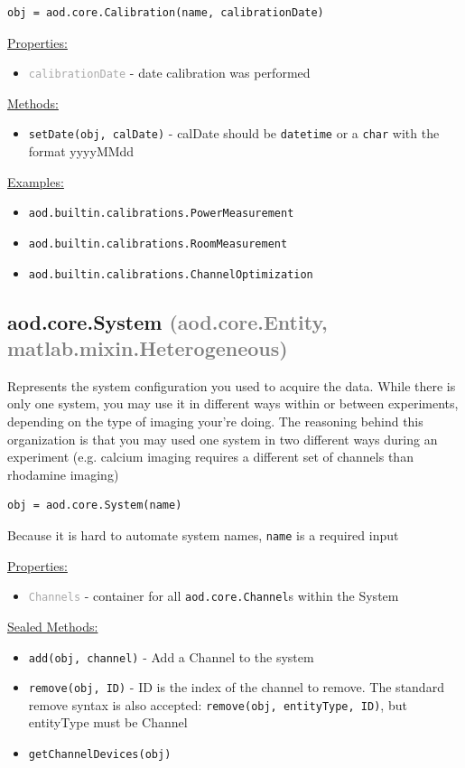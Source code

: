 \documentclass[10pt]{exam}
\newcommand\myparent[1]{\textcolor{gray}{(#1)}}
\newcommand\aodclass[1]{\textcolor{codeblue}{\texttt{#1}}}
\newcommand\aodprop[1]{\textcolor{darkgray}{\texttt{#1}}}
\newcommand\aodfcn[1]{\textcolor{darkteal}{\texttt{#1}}}
\newcommand\docheader[1]{\vspace{0.6ex}\noindent\underline{#1}\vspace{0.15ex}}
\begin{document}
		\begin{lstlisting}[style=matlab-editor, basicstyle=\mlttfamily\footnotesize]
obj = aod.core.Calibration(name, calibrationDate)
		\end{lstlisting}
		\docheader{Properties:}
		\begin{itemize}
			\item \aodprop{calibrationDate} - date calibration was performed
		\end{itemize}
		\docheader{Methods:}
		\begin{itemize}
			\item \aodfcn{setDate(obj, calDate)} - calDate should be \aodclass{datetime} or a \aodclass{char} with the format yyyyMMdd
		\end{itemize}
		\docheader{Examples:}
		\begin{itemize}
			\item \aodclass{aod.builtin.calibrations.PowerMeasurement}
			\item \aodclass{aod.builtin.calibrations.RoomMeasurement}
			\item \aodclass{aod.builtin.calibrations.ChannelOptimization}
		\end{itemize}
	\subsection{aod.core.System \myparent{aod.core.Entity, matlab.mixin.Heterogeneous}}
		\label{subsection:SystemDoc}
		\noindent Represents the system configuration you used to acquire the data. While there is only one system, you may use it in different ways within or between experiments, depending on the type of imaging your're doing. The reasoning behind this organization is that you may used one system in two different ways during an experiment (e.g. calcium imaging requires a different set of channels than rhodamine imaging)
	
		\begin{lstlisting}[style=matlab-editor, basicstyle=\mlttfamily\footnotesize]
obj = aod.core.System(name)
		\end{lstlisting}
		\noindent Because it is hard to automate system names, \texttt{name} is a required input
		
		\docheader{Properties:}
		\begin{itemize}
			\item \aodprop{Channels} - container for all \aodclass{aod.core.Channel}s within the System
		\end{itemize}
		\docheader{Sealed Methods:}
		\begin{itemize}
			\item \aodfcn{add(obj, channel)} - Add a Channel to the system
			\item \aodfcn{remove(obj, ID)} - ID is the index of the channel to remove. The standard remove syntax is also accepted: \aodfcn{remove(obj, entityType, ID)}, but entityType must be Channel
			\item \aodfcn{getChannelDevices(obj)}
		\end{itemize}
		
\end{document}
